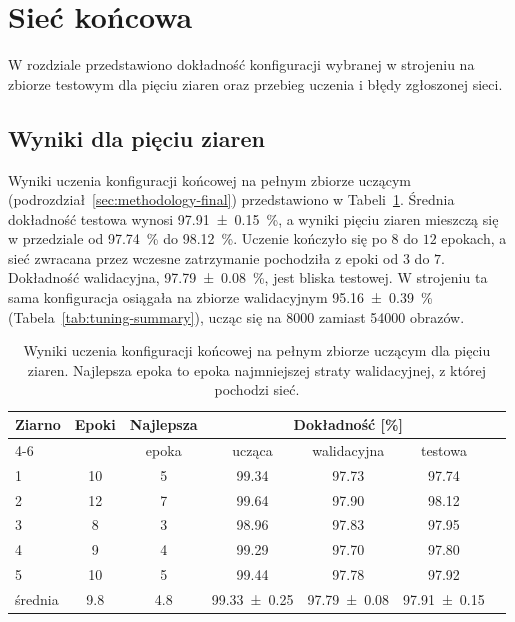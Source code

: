 \section{Sieć końcowa}
\label{sec:final}

W rozdziale przedstawiono dokładność konfiguracji wybranej w strojeniu na zbiorze testowym dla pięciu ziaren oraz przebieg uczenia i błędy zgłoszonej sieci.

\subsection{Wyniki dla pięciu ziaren}
\label{sec:final-seeds}

Wyniki uczenia konfiguracji końcowej na pełnym zbiorze uczącym (podrozdział~\ref{sec:methodology-final}) przedstawiono w Tabeli~\ref{tab:final-seeds}. Średnia dokładność testowa wynosi \qty{97.91 +- 0.15}{\percent}, a wyniki pięciu ziaren mieszczą się w przedziale od \qty{97.74}{\percent} do \qty{98.12}{\percent}. Uczenie kończyło się po $8$ do $12$ epokach, a sieć zwracana przez wczesne zatrzymanie pochodziła z epoki od $3$ do $7$. Dokładność walidacyjna, \qty{97.79 +- 0.08}{\percent}, jest bliska testowej. W strojeniu ta sama konfiguracja osiągała na zbiorze walidacyjnym \qty{95.16 +- 0.39}{\percent} (Tabela~\ref{tab:tuning-summary}), ucząc się na \num{8000} zamiast \num{54000} obrazów.

\begin{table}[H]
    \centering
    \caption{Wyniki uczenia konfiguracji końcowej na pełnym zbiorze uczącym dla pięciu ziaren. Najlepsza epoka to epoka najmniejszej straty walidacyjnej, z której pochodzi sieć.}
    \label{tab:final-seeds}
    \begin{tabular}{lcccccc}
        \toprule
        Ziarno & Epoki & Najlepsza & \multicolumn{3}{c}{Dokładność [\%]} \\
        \cmidrule(lr){4-6}
        & & epoka & ucząca & walidacyjna & testowa \\
        \midrule
        1 & 10 & 5 & \num{99.34} & \num{97.73} & \num{97.74} \\
        2 & 12 & 7 & \num{99.64} & \num{97.90} & \num{98.12} \\
        3 & 8 & 3 & \num{98.96} & \num{97.83} & \num{97.95} \\
        4 & 9 & 4 & \num{99.29} & \num{97.70} & \num{97.80} \\
        5 & 10 & 5 & \num{99.44} & \num{97.78} & \num{97.92} \\
        \midrule
        średnia & \num{9.8} & \num{4.8} & \num{99.33 +- 0.25} & \num{97.79 +- 0.08} & \num{97.91 +- 0.15} \\
        \bottomrule
    \end{tabular}
\end{table}

